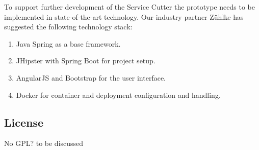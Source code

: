 To support further development of the Service Cutter the prototype needs to be implemented in state-of-the-art technology. Our industry partner Zühlke has suggested the following technology stack:

\begin{enumerate}
	\item Java Spring as a base framework. 
	\item JHipster with Spring Boot for project setup.
	\item AngularJS and Bootstrap for the user interface.
	\item Docker for container and deployment configuration and handling. 
\end{enumerate}

\subsection{License}

No GPL? to be discussed %